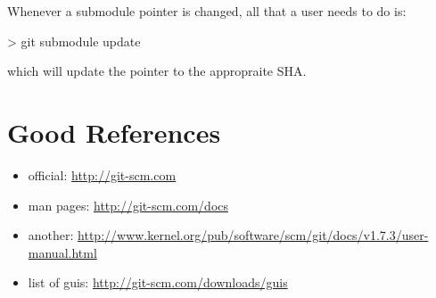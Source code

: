 \documentclass[10pt,letterpaper]{article}
\begin{document}
Whenever a submodule pointer is changed, all that a user needs to do is:
\begin{code}
> git submodule update
\end{code}
\noindent which will update the pointer to the appropraite SHA.



\section{Good References}
\begin{itemize}
\item official: \url{http://git-scm.com}
\item man pages: \url{http://git-scm.com/docs}
\item another: \url{http://www.kernel.org/pub/software/scm/git/docs/v1.7.3/user-manual.html}
\item list of guis: \url{http://git-scm.com/downloads/guis}
\end{itemize}
\end{document}
